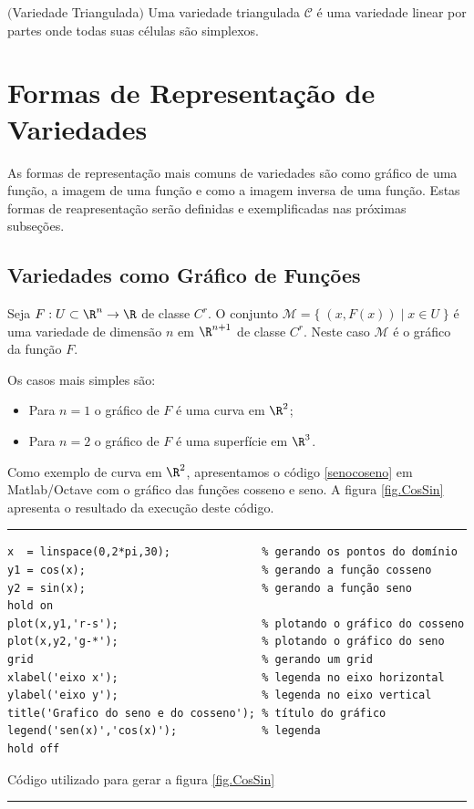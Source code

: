 \begin{defi} $($Variedade Triangulada$)$
Uma variedade triangulada $\mathcal{C}$ é uma variedade linear por partes onde todas suas células são simplexos.
\end{defi}




\section{Formas de Representação de Variedades}\label{var_formas}

As formas de representação mais comuns de variedades são como gráfico de uma função, a imagem de uma função e como a imagem inversa de uma função.
Estas formas de reapresentação serão definidas e exemplificadas nas próximas subseções.


\subsection{Variedades como Gráfico de Funções}\label{var_grafico}


Seja $F: U \subset \R^n \rightarrow \R$ de classe $C^r$. O conjunto
$\mathcal{M} = \{ \; (x,F(x)) \; | \; x \in U \; \}$ é uma variedade de dimensão $n$ em $\R^{n+1}$ de classe $C^r$.
Neste caso $\mathcal{M}$ é o gráfico da função $F$.

Os casos mais simples s\~ao:
\begin{itemize}
 \item Para $n=1$ o gráfico de $F$ \'e uma curva em $\R^2$;
 \item Para $n=2$ o gráfico de $F$ \'e uma superf\'icie em $\R^3$.
\end{itemize}

 Como exemplo de curva em $\R^2$, apresentamos o código \ref{senocoseno} em Matlab/Octave com o gráfico das funções cosseno e seno. A figura \ref{fig.CosSin} apresenta o resultado da execução deste código. 

\begin{Codigo}[htpb]
\noindent\rule{13cm}{1.pt}
\begin{verbatim}
x  = linspace(0,2*pi,30);              % gerando os pontos do domínio
y1 = cos(x);                           % gerando a função cosseno 
y2 = sin(x);                           % gerando a função seno 
hold on
plot(x,y1,'r-s');                      % plotando o gráfico do cosseno
plot(x,y2,'g-*');                      % plotando o gráfico do seno
grid                                   % gerando um grid
xlabel('eixo x');                      % legenda no eixo horizontal
ylabel('eixo y');                      % legenda no eixo vertical
title('Grafico do seno e do cosseno'); % título do gráfico 
legend('sen(x)','cos(x)');             % legenda
hold off
\end{verbatim}
\vspace{-0.5cm}
\caption{Código utilizado para gerar a figura \ref{fig.CosSin} } 
\noindent\rule{13cm}{1.pt}
\label{senocoseno}
\end{Codigo}

